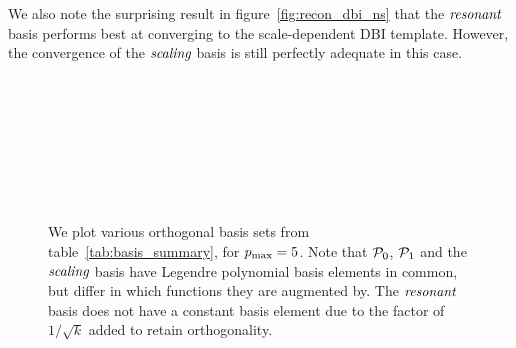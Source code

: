     We also note the surprising result in figure~\ref{fig:recon_dbi_ns}
    that the $\textit{resonant}$ basis performs best at converging to the
    scale-dependent DBI template. However, the convergence of the
    $\textit{scaling}$ basis is still perfectly adequate in this case.
    \begin{figure}[!pth]
        \centering
        \\
        \\
        \\
        \caption{}
    \end{figure}
    \begin{figure}[!pth]
        \ContinuedFloat
        \centering
        \\
        \\
        \\
        \caption{
            We plot various orthogonal basis sets from table~\ref{tab:basis_summary},
            for $p_\text{max}=5$. Note that $\mathcal{P}_0$, $\mathcal{P}_1$ and the $\textit{scaling}$ basis
            have Legendre polynomial basis elements in common, but differ in
            which functions they are augmented by. The $\textit{resonant}$ basis
            does not have a constant basis element due to the factor of
            $1/\sqrt{k}$ added to retain orthogonality.
            }\label{fig:basis_pmax5_plots}
    \end{figure}
